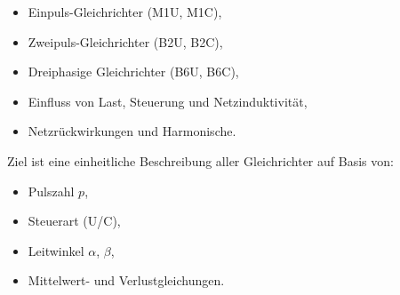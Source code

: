\begin{itemize}
\item Einpuls-Gleichrichter (M1U, M1C),
\item Zweipuls-Gleichrichter (B2U, B2C),
\item Dreiphasige Gleichrichter (B6U, B6C),
\item Einfluss von Last, Steuerung und Netzinduktivität,
\item Netzrückwirkungen und Harmonische.
\end{itemize}

Ziel ist eine einheitliche Beschreibung aller Gleichrichter
auf Basis von:

\begin{itemize}
\item Pulszahl $p$,
\item Steuerart (U/C),
\item Leitwinkel $\alpha$, $\beta$,
\item Mittelwert- und Verlustgleichungen.
\end{itemize}




